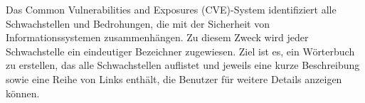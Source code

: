 Das Common Vulnerabilities and Exposures (CVE)-System identifiziert alle Schwachstellen und Bedrohungen, die mit der Sicherheit von Informationssystemen zusammenhängen. Zu diesem Zweck wird jeder Schwachstelle ein eindeutiger Bezeichner zugewiesen. Ziel ist es, ein Wörterbuch zu erstellen, das alle Schwachstellen auflistet und jeweils eine kurze Beschreibung sowie eine Reihe von Links enthält, die Benutzer für weitere Details anzeigen können\cite{cve18}.
















